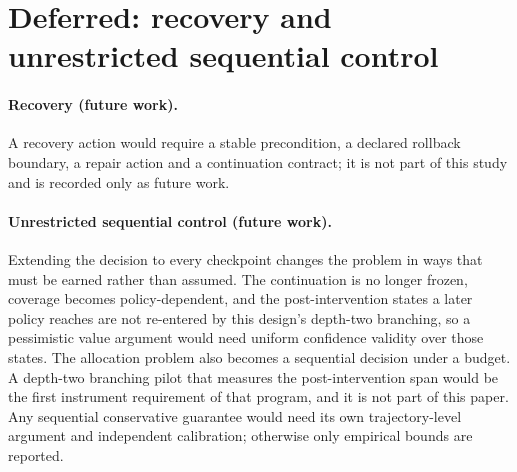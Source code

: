 \section{Deferred: recovery and unrestricted sequential control}
\label{sec:b-bridge}

\paragraph{Recovery (future work).}
A recovery action would require a stable precondition, a declared rollback
boundary, a repair action and a continuation contract; it is not part of this
study and is recorded only as future work.

\paragraph{Unrestricted sequential control (future work).}
Extending the decision to every checkpoint changes the problem in ways that must
be earned rather than assumed.  The continuation is no longer frozen, coverage
becomes policy-dependent, and the post-intervention states a later policy reaches
are not re-entered by this design's depth-two branching, so a pessimistic value
argument would need uniform confidence validity over those states.  The
allocation problem also becomes a sequential decision under a budget.  A
depth-two branching pilot that measures the post-intervention span would be the
first instrument requirement of that program, and it is not part of this paper.
Any sequential conservative guarantee would need its own trajectory-level
argument and independent calibration; otherwise only empirical bounds are
reported.
